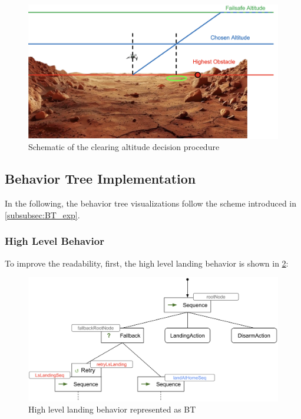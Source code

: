     \begin{figure}[h]
    \centering
    \includegraphics[scale=0.2]{images/autonomous_landing/clearing_altitude.png}
    \caption{Schematic of the clearing altitude decision procedure}
    \label{fig:clear_alt}
    \end{figure}

\subsection{Behavior Tree Implementation}\label{subsec:behavior_tree}

In the following, the behavior tree visualizations follow the scheme introduced in \cref{subsubsec:BT_exp}.

\subsubsection{High Level Behavior}

To improve the readability, first, the high level landing behavior is shown in \cref{fig:high_lvl_bt}:

\begin{figure}[h]
\centering
\includegraphics[scale=0.18]{images/autonomous_landing/high_level_BT.png}
\caption{High level landing behavior represented as BT}
\label{fig:high_lvl_bt}
\end{figure}


